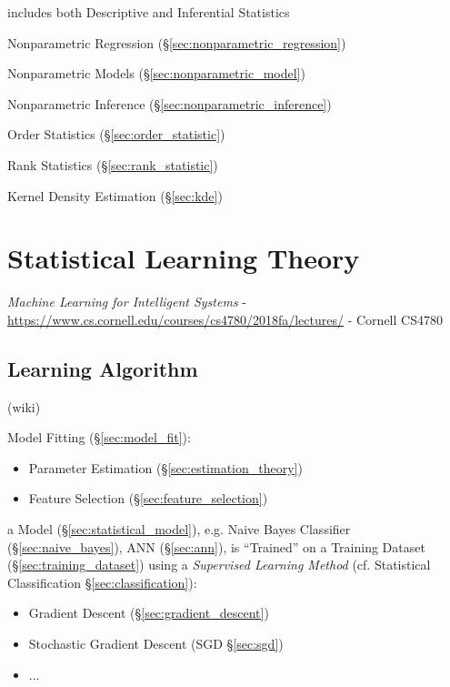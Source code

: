 includes both Descriptive and Inferential Statistics

Nonparametric Regression (\S\ref{sec:nonparametric_regression})

Nonparametric Models (\S\ref{sec:nonparametric_model})

Nonparametric Inference (\S\ref{sec:nonparametric_inference})

Order Statistics (\S\ref{sec:order_statistic})

Rank Statistics (\S\ref{sec:rank_statistic})

Kernel Density Estimation (\S\ref{sec:kde})



\section{Statistical Learning Theory}\label{sec:statistical_learning_theory}

\emph{Machine Learning for Intelligent Systems} -
\url{https://www.cs.cornell.edu/courses/cs4780/2018fa/lectures/} -
Cornell CS4780



\subsection{Learning Algorithm}\label{sec:learning_algorithm}

(wiki)

Model Fitting (\S\ref{sec:model_fit}):
\begin{itemize}
  \item Parameter Estimation (\S\ref{sec:estimation_theory})
  \item Feature Selection (\S\ref{sec:feature_selection})
\end{itemize}

a Model (\S\ref{sec:statistical_model}), e.g. Naive Bayes Classifier
(\S\ref{sec:naive_bayes}), ANN (\S\ref{sec:ann}), is ``Trained'' on a Training
Dataset (\S\ref{sec:training_dataset}) using a \emph{Supervised Learning Method}
(cf. Statistical Classification \S\ref{sec:classification}):
\begin{itemize}
  \item Gradient Descent (\S\ref{sec:gradient_descent})
  \item Stochastic Gradient Descent (SGD \S\ref{sec:sgd})
  \item ...
\end{itemize}


